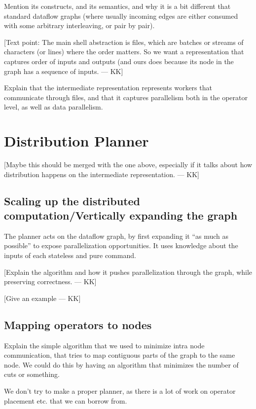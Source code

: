 \documentclass[sigplan,10pt,review,anonymous]{acmart}
\newcommand{\kk}[1]{[{\color{magenta}#1 --- KK}]}
\begin{document}
Mention its constructs, and its semantics, and why it is a bit
different that standard dataflow graphs (where usually incoming edges
are either consumed with some arbitrary interleaving, or pair by
pair).

\kk{Text point: The main shell abstraction is files, which are batches
  or streams of characters (or lines) where the order matters. So we
  want a representation that captures order of inputs and outputs (and
  ours does because its node in the graph has a sequence of inputs.}

Explain that the intermediate representation represents workers that
communicate through files, and that it captures parallelism both in
the operator level, as well as data parallelism.

\section{Distribution Planner}

\kk{Maybe this should be merged with the one above, especially if it
  talks about how distribution happens on the intermediate
  representation.}

\subsection{Scaling up the distributed computation/Vertically expanding the graph}

The planner acts on the dataflow graph, by first expanding it ``as
much as possible'' to expose parallelization opportunities. It uses
knowledge about the inputs of each stateless and pure command.

\kk{Explain the algorithm and how it pushes parallelization through
  the graph, while preserving correctness.}

\kk{Give an example}

\subsection{Mapping operators to nodes}

Explain the simple algorithm that we used to minimize intra node
communication, that tries to map contiguous parts of the graph to the
same node. We could do this by having an algorithm that minimizes the
number of cuts or something.

We don't try to make a proper planner, as there is a lot of work on
operator placement etc. that we can borrow from.
\end{document}
